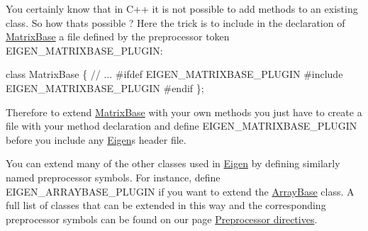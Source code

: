 You certainly know that in C++ it is not possible to add methods to an existing class. So how that\textquotesingle{}s possible ? Here the trick is to include in the declaration of \hyperlink{group___core___module_class_eigen_1_1_matrix_base}{Matrix\+Base} a file defined by the preprocessor token {\ttfamily E\+I\+G\+E\+N\+\_\+\+M\+A\+T\+R\+I\+X\+B\+A\+S\+E\+\_\+\+P\+L\+U\+G\+IN\+:} 
\begin{DoxyCode}
\textcolor{keyword}{class }MatrixBase \{
  \textcolor{comment}{// ...}
\textcolor{preprocessor}{  #ifdef EIGEN\_MATRIXBASE\_PLUGIN}
\textcolor{preprocessor}{  #include EIGEN\_MATRIXBASE\_PLUGIN}
\textcolor{preprocessor}{  #endif}
\textcolor{preprocessor}{\};}
\end{DoxyCode}
 Therefore to extend \hyperlink{group___core___module_class_eigen_1_1_matrix_base}{Matrix\+Base} with your own methods you just have to create a file with your method declaration and define E\+I\+G\+E\+N\+\_\+\+M\+A\+T\+R\+I\+X\+B\+A\+S\+E\+\_\+\+P\+L\+U\+G\+IN before you include any \hyperlink{namespace_eigen}{Eigen}\textquotesingle{}s header file.

You can extend many of the other classes used in \hyperlink{namespace_eigen}{Eigen} by defining similarly named preprocessor symbols. For instance, define {\ttfamily E\+I\+G\+E\+N\+\_\+\+A\+R\+R\+A\+Y\+B\+A\+S\+E\+\_\+\+P\+L\+U\+G\+IN} if you want to extend the \hyperlink{group___core___module_class_eigen_1_1_array_base}{Array\+Base} class. A full list of classes that can be extended in this way and the corresponding preprocessor symbols can be found on our page \hyperlink{TopicPreprocessorDirectives}{Preprocessor directives}.

